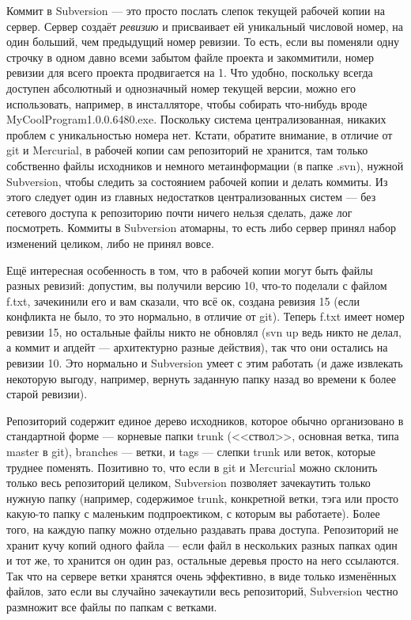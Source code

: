 \documentclass[a5paper]{article}
\begin{document}
Коммит в Subversion --- это просто послать слепок текущей рабочей копии на сервер. Сервер создаёт \textit{ревизию} и присваивает ей уникальный числовой номер, на один больший, чем предыдущий номер ревизии. То есть, если вы поменяли одну строчку в одном давно всеми забытом файле проекта и закоммитили, номер ревизии для всего проекта продвигается на 1. Что удобно, поскольку всегда доступен абсолютный и однозначный номер текущей версии, можно его использовать, например, в инсталляторе, чтобы собирать что-нибудь вроде MyCoolProgram1.0.0.6480.exe. Поскольку система централизованная, никаких проблем с уникальностью номера нет. Кстати, обратите внимание, в отличие от git и Mercurial, в рабочей копии сам репозиторий не хранится, там только собственно файлы исходников и немного метаинформации (в папке .svn), нужной Subversion, чтобы следить за состоянием рабочей копии и делать коммиты. Из этого следует один из главных недостатков централизованных систем --- без сетевого доступа к репозиторию почти ничего нельзя сделать, даже лог посмотреть. Коммиты в Subversion атомарны, то есть либо сервер принял набор изменений целиком, либо не принял вовсе. 

Ещё интересная особенность в том, что в рабочей копии могут быть файлы разных ревизий: допустим, вы получили версию 10, что-то поделали с файлом f.txt, зачекинили его и вам сказали, что всё ок, создана ревизия 15 (если конфликта не было, то это нормально, в отличие от git). Теперь f.txt имеет номер ревизии 15, но остальные файлы никто не обновлял (svn up ведь никто не делал, а коммит и апдейт --- архитектурно разные действия), так что они остались на ревизии 10. Это нормально и Subversion умеет с этим работать (и даже извлекать некоторую выгоду, например, вернуть заданную папку назад во времени к более старой ревизии).

Репозиторий содержит единое дерево исходников, которое обычно организовано в стандартной форме --- корневые папки trunk (<<ствол>>, основная ветка, типа master в git), branches --- ветки, и tags --- слепки trunk или веток, которые труднее поменять. Позитивно то, что если в git и Mercurial можно склонить только весь репозиторий целиком, Subversion позволяет зачекаутить только нужную папку (например, содержимое trunk, конкретной ветки, тэга или просто какую-то папку с маленьким подпроектиком, с которым вы работаете). Более того, на каждую папку можно отдельно раздавать права доступа. Репозиторий не хранит кучу копий одного файла --- если файл в нескольких разных папках один и тот же, то хранится он один раз, остальные деревья просто на него ссылаются. Так что на сервере ветки хранятся очень эффективно, в виде только изменённых файлов, зато если вы случайно зачекаутили весь репозиторий, Subversion честно размножит все файлы по папкам с ветками.
\end{document}
